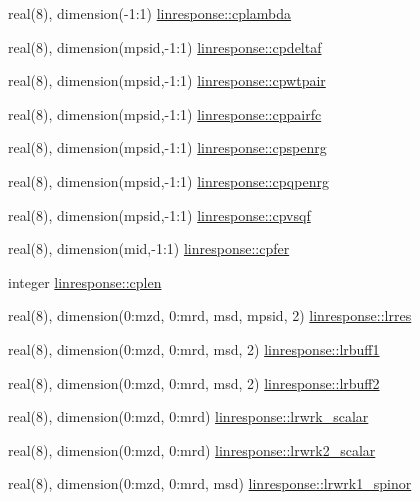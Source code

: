 \begin{DoxyCompactItemize}
\item 
real(8), dimension(-\/1\+:1) \hyperlink{namespacelinresponse_a7af204e35af6978c1c90366dab7d3ea3}{linresponse\+::cplambda}
\item 
real(8), dimension(mpsid,-\/1\+:1) \hyperlink{namespacelinresponse_ad4b3bc883634141ca4d1fc2553bf3182}{linresponse\+::cpdeltaf}
\item 
real(8), dimension(mpsid,-\/1\+:1) \hyperlink{namespacelinresponse_a3b5067bbf38f7b8e3a74eeeea5464a3d}{linresponse\+::cpwtpair}
\item 
real(8), dimension(mpsid,-\/1\+:1) \hyperlink{namespacelinresponse_aa3625b28311dd74ef8e9faa6a05297f8}{linresponse\+::cppairfc}
\item 
real(8), dimension(mpsid,-\/1\+:1) \hyperlink{namespacelinresponse_a4beb9ddcbc5b71a35a428344e28d342b}{linresponse\+::cpspenrg}
\item 
real(8), dimension(mpsid,-\/1\+:1) \hyperlink{namespacelinresponse_abb8495e6e268bf84381fef93f7b5d914}{linresponse\+::cpqpenrg}
\item 
real(8), dimension(mpsid,-\/1\+:1) \hyperlink{namespacelinresponse_a48c34fbf632c40c01f13f84e69353096}{linresponse\+::cpvsqf}
\item 
real(8), dimension(mid,-\/1\+:1) \hyperlink{namespacelinresponse_a4f6ff81d700596dc1bbcccd3072a6a40}{linresponse\+::cpfer}
\item 
integer \hyperlink{namespacelinresponse_a03188f86a350cdc6ecb12f090d8e80a7}{linresponse\+::cplen}
\item 
real(8), dimension(0\+:mzd, 0\+:mrd, msd, mpsid, 2) \hyperlink{namespacelinresponse_afc26a0c3d8de439056bba96da16a1a29}{linresponse\+::lrres}
\item 
real(8), dimension(0\+:mzd, 0\+:mrd, msd, 2) \hyperlink{namespacelinresponse_a58c5521a878e9ff5087a49ec0c43223c}{linresponse\+::lrbuff1}
\item 
real(8), dimension(0\+:mzd, 0\+:mrd, msd, 2) \hyperlink{namespacelinresponse_ab52dee8da1470dbf62697745e6f59aa4}{linresponse\+::lrbuff2}
\item 
real(8), dimension(0\+:mzd, 0\+:mrd) \hyperlink{namespacelinresponse_afed5ca6b47765e612176f3f7353d21a8}{linresponse\+::lrwrk\+\_\+scalar}
\item 
real(8), dimension(0\+:mzd, 0\+:mrd) \hyperlink{namespacelinresponse_a9e65ade8c2b85220fe4f21d39b463c8f}{linresponse\+::lrwrk2\+\_\+scalar}
\item 
real(8), dimension(0\+:mzd, 0\+:mrd, msd) \hyperlink{namespacelinresponse_a568691ca253a1c4f233388d844861a24}{linresponse\+::lrwrk1\+\_\+spinor}

\end{DoxyCompactItemize}
